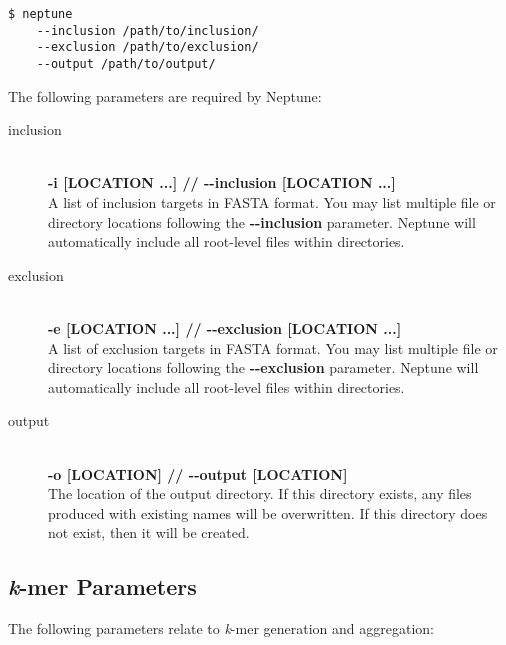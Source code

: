 \documentclass[a4paper,10pt]{article}
\begin{document}
\begin{minipage}{\linewidth}
\begin{lstlisting}[frame=single, style=bash]
$ neptune
    --inclusion /path/to/inclusion/
    --exclusion /path/to/exclusion/
    --output /path/to/output/
\end{lstlisting}
\end{minipage}

The following parameters are required by Neptune:

\begin{description}

  \item[inclusion] \hfill \\
  \textbf{-i [LOCATION ...] // -{}-inclusion [LOCATION ...]} \hfill \\
  A list of inclusion targets in FASTA format. You may list multiple file or directory locations following the \textbf{-{}-inclusion} parameter. Neptune will automatically include all root-level files within directories.  
  
  \item[exclusion] \hfill \\
  \textbf{-e [LOCATION ...] // -{}-exclusion [LOCATION ...]} \hfill \\
  A list of exclusion targets in FASTA format. You may list multiple file or directory locations following the \textbf{-{}-exclusion} parameter. Neptune will automatically include all root-level files within directories.
  
  \item[output] \hfill \\
  \textbf{-o [LOCATION] // -{}-output [LOCATION]} \hfill \\
  The location of the output directory. If this directory exists, any files produced with existing names will be overwritten. If this directory does not exist, then it will be created.
  
\end{description}

\subsection{\textit{k}-mer Parameters}

The following parameters relate to \textit{k}-mer generation and aggregation:
\end{document}
